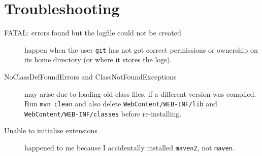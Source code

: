 \documentclass[12pt,a4paper]{article}
\begin{document}
\section{Troubleshooting}
\begin{description}
  \item[FATAL\@: errors found but the logfile could not be created] happen when the user {\tt git} has not got correct permissions or ownership on its home directory (or where it stores the logs).

  \item[NoClassDefFoundError{\rm s and} ClassNotFoundException{\rm s}] may arise due to loading old class files, if a different version was compiled. Run {\tt mvn clean} and also delete {\tt WebContent/WEB-INF/lib} and {\tt WebContent/WEB-INF/classes} before re-installing.

  \item[Unable to initialise extensions] happened to me because I accidentally installed {\tt maven2}, not {\tt maven}.

\end{description}
\end{document}
